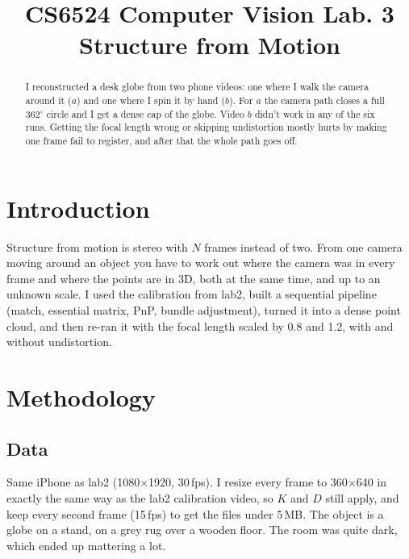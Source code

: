 \documentclass[conference]{assets/latex/IEEEtran}
\begin{document}
\title{CS6524 Computer Vision Lab. 3\\ Structure from Motion}

\author{
}

\maketitle

\begin{abstract}
I reconstructed a desk globe from two phone videos: one where I walk the
camera around it ($a$) and one where I spin it by hand ($b$). For $a$ the
camera path closes a full $362^\circ$ circle and I get a dense cap of the
globe. Video $b$ didn't work in any of the six runs. Getting the focal length
wrong or skipping undistortion mostly hurts by making one frame fail to
register, and after that the whole path goes off.
\end{abstract}

\section{Introduction}
Structure from motion is stereo with $N$ frames instead of two. From one
camera moving around an object you have to work out where the camera was in
every frame and where the points are in 3D, both at the same time, and up to
an unknown scale. I used the calibration from lab2, built a sequential
pipeline (match, essential matrix, PnP, bundle adjustment), turned it into a
dense point cloud, and then re-ran it with the focal length scaled by 0.8 and
1.2, with and without undistortion.

\section{Methodology}

\subsection{Data}
Same iPhone as lab2 (1080$\times$1920, 30\,fps). I resize every frame to
360$\times$640 in exactly the same way as the lab2 calibration video, so $K$
and $D$ still apply, and keep every second frame (15\,fps) to get the files
under 5\,MB. The object is a globe on a stand, on a grey rug over a wooden
floor. The room was quite dark, which ended up mattering a lot.
\end{document}
